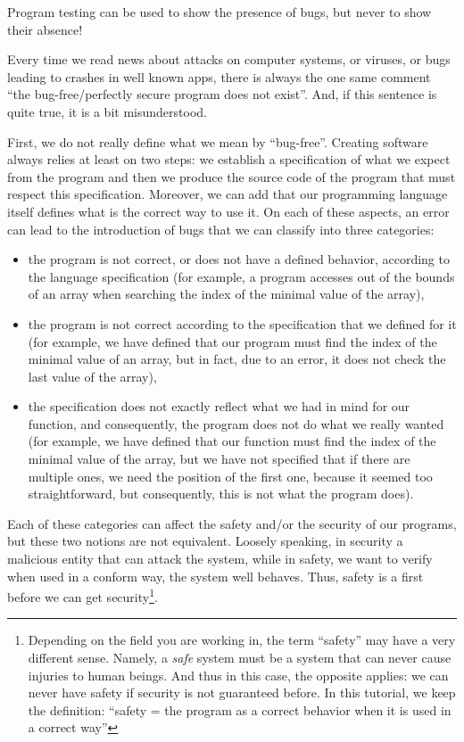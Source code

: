 \begin{Quotation}[Dijkstra]
Program testing can be used to show the presence of bugs, but never to show
their absence!
\end{Quotation}




Every time we read news about attacks on computer systems, or
viruses, or bugs leading to crashes in well known apps, there is always
the one same comment ``the bug-free/perfectly secure program does not
exist''. And, if this sentence is quite true, it is a bit misunderstood.


First, we do not really define what we mean by ``bug-free''. Creating
software always relies at least on two steps: we establish a specification
of what we expect from the program and then we produce the source code of
the program that must respect this specification. Moreover, we can add that
our programming language itself defines what is the correct way to use it.
On each of these aspects, an error can lead to the introduction of bugs that
we can classify into three categories:


\begin{itemize}
\item the program is not correct, or does not have a defined behavior,
      according to the language specification (for example, a program
      accesses out of the bounds of an array when searching the index of
      the minimal value of the array),
\item the program is not correct according to the specification that we
      defined for it (for example, we have defined that our program must
      find the index of the minimal value of an array, but in fact, due to
      an error, it does not check the last value of the array),
\item the specification does not exactly reflect what we had in mind for
      our function, and consequently, the program does not do what we really
      wanted (for example, we have defined that our function must find the
      index of the minimal value of the array, but we have not specified that
      if there are multiple ones, we need the position of the first one,
      because it seemed too straightforward, but consequently, this is not
      what the program does).
\end{itemize}


Each of these categories can affect the safety and/or the security of our
programs, but these two notions are not equivalent. Loosely speaking,
in security a malicious entity that can attack the system, while in safety, we
want to verify when used in a conform way, the system well behaves. Thus, safety
is a first before we can get security\footnote{Depending on the field you are
  working in, the term ``safety'' may have a very different sense. Namely, a
  \textit{safe} system must be a system that can never cause injuries to human
  beings. And thus in this case, the opposite applies: we can never have safety
  if security is not guaranteed before. In this tutorial, we keep the definition:
  ``safety = the program as a correct behavior when it is used in a correct way''}.


